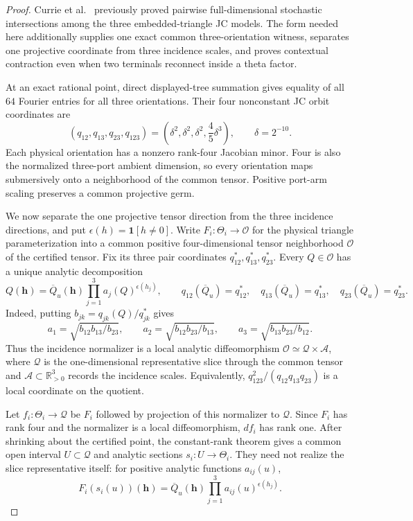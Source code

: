 \documentclass[11pt]{article}
\theoremstyle{remark}
\begin{document}
\begin{proof}
Currie et al.~\cite{CurrieEtAl2026} previously proved pairwise
full-dimensional stochastic intersections among the three embedded-triangle
JC models.  The form needed here additionally supplies one exact common
three-orientation witness, separates one projective coordinate from three
incidence scales, and proves contextual contraction even when two terminals
reconnect inside a theta factor.

At an exact rational point, direct displayed-tree summation gives equality of
all $64$ Fourier entries for all three orientations.  Their four nonconstant
JC orbit coordinates are
\[
(q_{12},q_{13},q_{23},q_{123})
=\left(\delta^2,\delta^2,\delta^2,\frac45\delta^3\right),
\qquad \delta=2^{-10}.
\]
Each physical orientation has a nonzero rank-four Jacobian minor.  Four is
also the normalized three-port ambient dimension, so every orientation maps
submersively onto a neighborhood of the common tensor.  Positive port-arm
scaling preserves a common projective germ.

We now separate the one projective tensor direction from the three incidence
directions, and put $\epsilon(h)=\mathbf1[h\ne0]$.  Write
$F_i:\Theta_i\to\mathcal O$ for the physical triangle
parameterization into a common positive four-dimensional tensor neighborhood
$\mathcal O$ of the certified tensor.  Fix its three pair coordinates
$q_{12}^*,q_{13}^*,q_{23}^*$.  Every $Q\in\mathcal O$ has a unique analytic
decomposition
\[
 Q(\mathbf h)=\overline Q_u(\mathbf h)
       \prod_{j=1}^3a_j(Q)^{\epsilon(h_j)},
 \qquad
 q_{12}(\overline Q_u)=q_{12}^*,\quad
 q_{13}(\overline Q_u)=q_{13}^*,\quad
 q_{23}(\overline Q_u)=q_{23}^*.
\]
Indeed, putting $b_{jk}=q_{jk}(Q)/q_{jk}^*$ gives
\[
 a_1=\sqrt{b_{12}b_{13}/b_{23}},\qquad
 a_2=\sqrt{b_{12}b_{23}/b_{13}},\qquad
 a_3=\sqrt{b_{13}b_{23}/b_{12}}.
\]
Thus the incidence normalizer is a local analytic diffeomorphism
$\mathcal O\simeq\mathcal Q\times\mathcal A$, where $\mathcal Q$ is the
one-dimensional representative slice through the common tensor and
$\mathcal A\subset\mathbb R_{>0}^3$ records the incidence scales.  Equivalently,
$q_{123}^2/(q_{12}q_{13}q_{23})$ is a local coordinate on the quotient.

Let $f_i:\Theta_i\to\mathcal Q$ be $F_i$ followed by projection of this
normalizer to $\mathcal Q$.  Since $F_i$ has rank four and the normalizer is a
local diffeomorphism, $df_i$ has rank one.  After shrinking about the certified
point, the constant-rank theorem gives a common open interval
$U\subset\mathcal Q$ and analytic sections $s_i:U\to\Theta_i$.  They need not
realize the slice representative itself: for positive analytic functions
$a_{ij}(u)$,
\[
 F_i(s_i(u))(\mathbf h)=\overline Q_u(\mathbf h)
       \prod_{j=1}^3a_{ij}(u)^{\epsilon(h_j)}.
\]


\end{proof}
\end{document}
